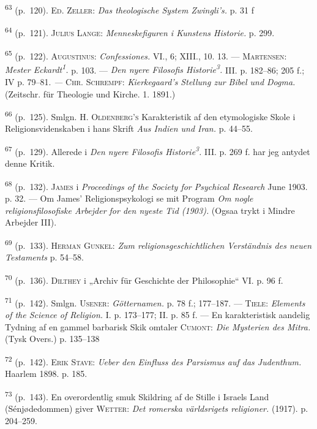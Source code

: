 \documentclass[12pt,a4paper,openany]{book}
\newcommand{\opage}[1]{\marginnote{\footnotesize\textit{[#1]}}}
\begin{document}
\begin{small}
\textsuperscript{63} (p.~120). \textsc{Ed. Zeller}: \textit{Das
theologische System Zwingli’s.} p. 31 f

\textsuperscript{64} (p.~121). \textsc{Julius Lange}:
\textit{Menneskefiguren i Kunstens Historie.} p.
299.

\textsuperscript{65} (p.~122). \textsc{Augustinus}:
\textit{Confessiones.} VI., 6; XIII., 10. 13. ---
\textsc{Martensen}: \textit{Mester Eckardt\textsuperscript{1}.} p. 103.
--- \textit{Den nyere Filosofis Historie\textsuperscript{3}.}
\opage{252}III. p. 182--86; 205 f.; IV p. 79--81. \textit{---}
\textsc{Chr}. \textsc{Schrempf}: \textit{Kierkegaard’s Stellung zur
Bibel und Dogma.} (Zeitschr. für Theologie und Kirche. 1. 1891.)

\textsuperscript{66} (p.~125). Smlgn. H. \textsc{Oldenberg’s}
Karakteristik af den etymologiske Skole i
Religionsvidenskaben i hans Skrift \textit{Aus Indien und Iran.} p.
44--55.

\textsuperscript{67} (p.~129). Allerede i \textit{Den nyere Filosofis
Historie\textsuperscript{3}.}
III. p. 269 f. har jeg antydet denne Kritik.

\textsuperscript{68} (p.~132). \textsc{James} i \textit{Proceedings of
the Society for Psychical
Research} June 1903. p. 32. --- Om James’ Religionspsykologi se mit
Program \textit{Om nogle religionsfilosofiske Arbejder for den nyeste
Tid (1903).} (Ogsaa trykt i Mindre Arbejder III).

\textsuperscript{69} (p.~133). \textsc{Herman Gunkel}: \textit{Zum
religionsgeschichtlichen Verständnis
des neuen Testaments} p. 54--58.

\textsuperscript{70} (p.~136). \textsc{Dilthey} i „Archiv für Geschichte
der Philosophie“ VI. p. 96 f.

\textsuperscript{71} (p.~142). Smlgn. \textsc{Usener:}
\textit{Götternamen.} p. 78 f.; 177--187. ---
\textsc{Tiele}: \textit{Elements of the Science of Religion.} I. p.
173--177; II. p. 85 f. --- En karakteristisk aandelig Tydning af en
gammel barbarisk Skik omtaler \textsc{Cumont}: \textit{Die Mysterien des
Mitra.}(Tysk Overs.) p. 135--138

\textsuperscript{72} (p.~142). \textsc{Erik Stave}: \textit{Ueber den
Einfluss des Parsismus auf das
Judenthum.} Haarlem 1898. p. 185.

\textsuperscript{73} (p.~143). En overordentlig smuk Skildring af de
Stille i Israels Land
(Sénjødedommen) giver \textsc{Wetter}: \textit{Det romerska världsrigets
religioner.} (1917). p. 204--259.


\end{small}
\end{document}
